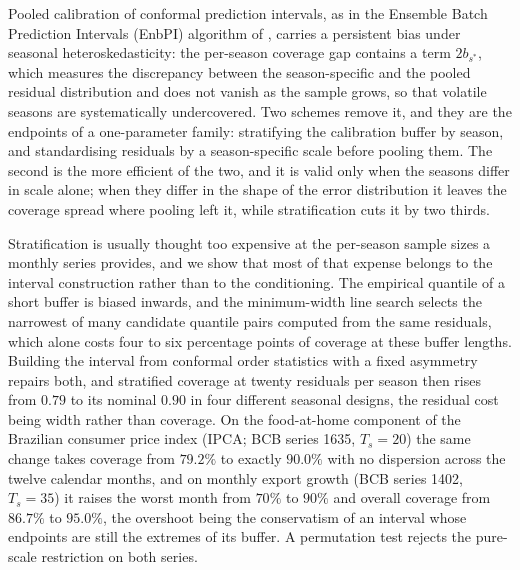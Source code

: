 Pooled calibration of conformal prediction intervals, as in the
Ensemble Batch Prediction Intervals (EnbPI) algorithm of
\citet{xu2023conformal}, carries a persistent bias under seasonal
heteroskedasticity: the per-season coverage gap contains a term
$2b_{s^*}$, which measures the discrepancy between the season-specific
and the pooled residual distribution and does not vanish as the sample
grows, so that volatile seasons are systematically undercovered.  Two
schemes remove it, and they are the endpoints of a one-parameter
family: stratifying the calibration buffer by season, and standardising
residuals by a season-specific scale before pooling them.  The second
is the more efficient of the two, and it is valid only when the seasons
differ in scale alone; when they differ in the shape of the error
distribution it leaves the coverage spread where pooling left it, while
stratification cuts it by two thirds.

Stratification is usually thought too expensive at the per-season
sample sizes a monthly series provides, and we show that most of that
expense belongs to the interval construction rather than to the
conditioning.  The empirical quantile of a short buffer is biased
inwards, and the minimum-width line search selects the narrowest of
many candidate quantile pairs computed from the same residuals, which
alone costs four to six percentage points of coverage at these buffer
lengths.  Building the interval from conformal order statistics with a
fixed asymmetry repairs both, and stratified coverage at twenty
residuals per season then rises from $0.79$ to its nominal $0.90$ in
four different seasonal designs, the residual cost being width rather
than coverage.  On the food-at-home component of the Brazilian consumer
price index (IPCA; BCB series 1635, $T_s = 20$) the same change takes
coverage from $79.2\%$ to exactly $90.0\%$ with no dispersion across
the twelve calendar months, and on monthly export growth (BCB series
1402, $T_s = 35$) it raises the worst month from $70\%$ to $90\%$ and
overall coverage from $86.7\%$ to $95.0\%$, the overshoot being the
conservatism of an interval whose endpoints are still the extremes of
its buffer.  A permutation test rejects the pure-scale restriction on
both series.

\bigskip

